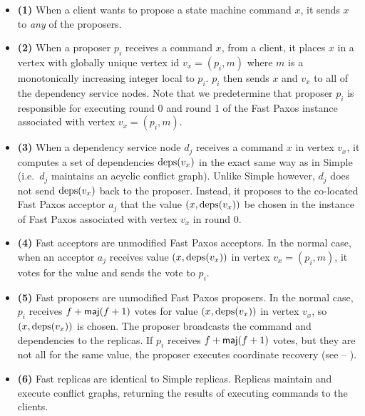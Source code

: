 \begin{itemize}
  \item \textbf{(1)}
    When a client wants to propose a state machine command $x$, it sends $x$ to
    \emph{any} of the proposers.

  \item \textbf{(2)}
    When a proposer $p_i$ receives a command $x$, from a client, it places $x$
    in a vertex with globally unique vertex id $v_x = (p_i, m)$ where $m$ is a
    monotonically increasing integer local to $p_i$. $p_i$ then sends $x$ and
    $v_x$ to all of the dependency service nodes. Note that we predetermine
    that proposer $p_i$ is responsible for executing round 0 and round 1 of the
    Fast Paxos instance associated with vertex $v_x = (p_i, m)$.

  \item \textbf{(3)}
    When a dependency service node $d_j$ receives a command $x$ in vertex
    $v_x$, it computes a set of dependencies $\text{deps}(v_x)$ in the exact same way
    as in Simple \BPaxos{} (i.e.\ $d_j$ maintains an acyclic conflict graph).
    Unlike Simple \BPaxos{} however, $d_j$ does not send $\text{deps}(v_x)$ back to
    the proposer. Instead, it proposes to the co-located Fast Paxos acceptor
    $a_j$ that the value $(x, \text{deps}(v_x))$ be chosen in the instance of Fast
    Paxos associated with vertex $v_x$ in round 0.

  \item \textbf{(4)}
    Fast \BPaxos{} acceptors are unmodified Fast Paxos acceptors. In the
    normal case, when an acceptor $a_j$ receives value $(x, \text{deps}(v_x))$ in
    vertex $v_x = (p_i, m)$, it votes for the value and sends the vote to
    $p_i$.

  \item \textbf{(5)}
    Fast \BPaxos{} proposers are unmodified Fast Paxos proposers. In the
    normal case, $p_i$ receives $f + \textsf{maj}(f+1)$ votes for value $(x,
    \text{deps}(v_x))$ in vertex $v_x$, so $(x, \text{deps}(v_x))$ is chosen. The proposer
    broadcasts the command and dependencies to the replicas.
    If $p_i$ receives $f + \textsf{maj}(f+1)$ votes, but they are not all for the same
    value, the proposer executes coordinate recovery (see
      --
    ).

  \item \textbf{(6)}
    Fast \BPaxos{} replicas are identical to Simple \BPaxos{} replicas.
    Replicas maintain and execute conflict graphs, returning the results of
    executing commands to the clients.
\end{itemize}

